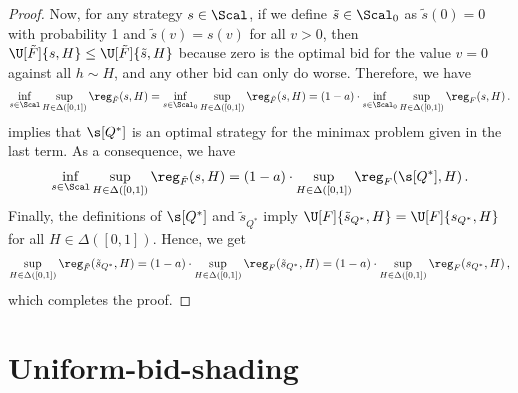 \begin{proof}
	Now, for any strategy $s \in \Scal$, if we define $\tilde s \in \Scal_0$ as $\tilde s(0) = 0$ with probability 1 and $\tilde s(v) = s(v)$ for all $v > 0$, then $\U[\tilde F]{s, H} \leq \U[\tilde F]{\tilde s, H}$ because zero is the optimal bid for the value $v = 0$ against all $h \sim H$, and any other bid can only do worse. Therefore, we have
	\begin{align*}
		\inf_{s \in \Scal} \sup_{H \in \Delta([0,1])} \reg_{\tilde F}(s, H) = \inf_{s \in \Scal_0} \sup_{H \in \Delta([0,1])} \reg_{\tilde F}(s, H) = (1 - a) \cdot \inf_{s \in \Scal_0} \sup_{H \in \Delta([0,1])} \reg_{F}(s, H)\,.
	\end{align*}
	 implies that $\s[Q^*]$ is an optimal strategy for the minimax problem given in the last term. As a consequence, we have
	\begin{align*}
		\inf_{s \in \Scal} \sup_{H \in \Delta([0,1])} \reg_{\tilde F}(s, H) = (1 - a) \cdot \sup_{H \in \Delta([0,1])} \reg_{F}(\s[Q^*], H)\,.
	\end{align*}
	Finally, the definitions of $\s[Q^*]$ and $\tilde s_{Q^*}$ imply $\U[F]{\tilde s_{Q^*}, H} = \U[F]{s_{Q^*}, H}$ for all $H \in \Delta([0,1])$. Hence, we get
	\begin{align*}
		\sup_{H \in \Delta([0,1])} \reg_{\tilde F}(\tilde s_{Q^*}, H) = (1 -a) \cdot \sup_{H \in \Delta([0,1])} \reg_{F}(\tilde s_{Q^*}, H)
		= (1 -a) \cdot \sup_{H \in \Delta([0,1])} \reg_{F}(s_{Q^*}, H)\,,
	\end{align*}
	which completes the proof.
\end{proof}




























\section{Uniform-bid-shading}\label{sec:uniform-bid-shading}


